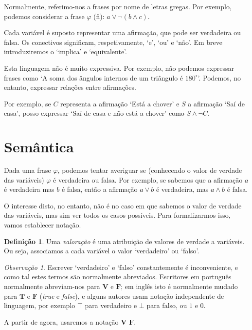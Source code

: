 \documentclass{article}
\theoremstyle{definition}
\newtheorem{definicao}{Definição}
\theoremstyle{remark}
\newtheorem{obs}{Observação}
\newcommand{\V}{\mathbf{V}}
\newcommand{\F}{\mathbf{F}}
\begin{document}
	Normalmente, referimo-nos a frases por nome de letras gregas. Por exemplo, podemos considerar a frase $\varphi$ (fi): $a \lor \neg(b \land c)$.
	
	Cada variável é suposto representar uma afirmação, que pode ser verdadeira ou falsa. Os conectivos significam, respetivamente, `e', `ou' e `não'. Em breve introduziremos o `implica' e `equivalente'.
	
	Esta linguagem não é muito expressiva. Por exemplo, não podemos expressar frases como `A soma dos ângulos internos de um triângulo é $180^\circ$'. Podemos, no entanto, expressar relações entre afirmações.
	
	Por exemplo, se $C$ representa a afirmação `Está a chover' e $S$ a afirmação `Saí de casa', posso expressar `Saí de casa e não está a chover' como $S \land \neg C$.
	
	\section{Semântica}
	
	Dada uma frase $\varphi$, podemos tentar averiguar se (conhecendo o valor de verdade das variáveis) $\varphi$ é verdadeira ou falsa. Por exemplo, se sabemos que a afirmação $a$ é verdadeira mas $b$ é falsa, então a afirmação $a \lor b$ é verdadeira, mas $a \land b$ é falsa.
	
	O interesse disto, no entanto, não é no caso em que sabemos o valor de verdade das variáveis, mas sim ver todos os casos possíveis. Para formalizarmos isso, vamos establecer notação.
	
	\begin{definicao}
	Uma \emph{valoração} é uma atribuição de valores de verdade a variáveis. Ou seja, associamos a cada variável o valor `verdadeiro' ou `falso'.
	\end{definicao}
	
	\begin{obs}
	Escrever `verdadeiro' e `falso' constantemente é inconveniente, e como tal estes termos são normalmente abreviados. Escritores em português normalmente abreviam-nos para $\V$ e $\F$; em inglês isto é normalmente mudado para $\mathbf{T}$ e $\mathbf{F}$ (\textit{true} e \textit{false}), e alguns autores usam notação independente de linguagem, por exemplo $\top$ para verdadeiro e $\bot$ para falso, ou $1$ e $0$.
	
	A partir de agora, usaremos a notação $\V$ $\F$.
	\end{obs}
	
\end{document}

